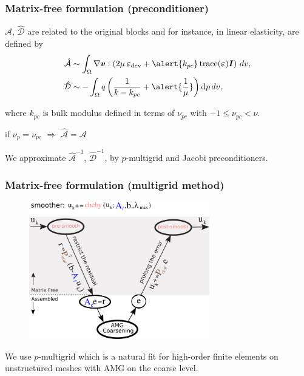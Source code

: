 \documentclass{beamer}
\newcommand{\bm}{\boldsymbol}
\newcommand\bulk{k}
\newcommand\trace{\operatorname{trace}}
\newcommand\diff{\operatorname{d}\!}
\begin{document}
\begin{frame}
	\frametitle{Matrix-free formulation (preconditioner)}
	\alert{$\mathcal{\hat A}$, $\mathcal{\hat D}$} are related to the original blocks and for instance, in linear elasticity, are defined by
	\begin{equation}\label{eq:mixed-linear-block-pc-operator}
		\begin{split}	
			\mathcal{\hat A} &\sim \int_{\Omega} \nabla \bm v :\left( 2\mu\, \bm\varepsilon_{\text{dev}} + \alert{\bulk_{pc}} \trace(\bm\varepsilon)\bm I \right) \, dv, \\ \nonumber
			\mathcal{\hat D} &\sim - \int_{\Omega} q \left(\frac{1}{\bulk - \bulk_{pc}} + \alert{\frac{1}{\mu}} \right)\diff p \, dv, \\
		\end{split}
	\end{equation}

	where $\bulk_{pc}$ is bulk modulus defined in terms of $\nu_{pc}$ with $-1 \leq \nu_{pc} < \nu$.
	
	\vspace{5mm}
	\alert{if $\nu_p = \nu_{pc}$ $\Longrightarrow$ $\mathcal{\hat A} = \mathcal{A}$}

	\vspace{5mm}
	\begin{tcolorbox}
		We approximate $\mathcal{\hat A}^{-1}$, $\mathcal{\hat D}^{-1}$, by $p$-multigrid and Jacobi preconditioners.
	\end{tcolorbox}
\end{frame}

\begin{frame}
	\frametitle{Matrix-free formulation (multigrid method)}
	\begin{figure} [h]
		\includegraphics[width=0.7\textwidth]{../figs/p-multigrid-cycle.png}
	\end{figure}

	\begin{tcolorbox}
		We use $p$-multigrid which is a natural fit for high-order finite elements on unstructured meshes with AMG on the coarse level.
	\end{tcolorbox}

\end{frame}
\end{document}
